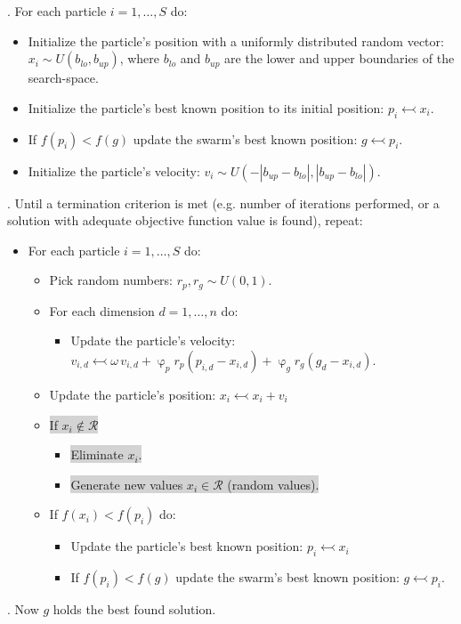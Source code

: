 \documentclass[10pt,letterpaper]{article}
\begin{document}
	. For each particle $i = 1,\ldots, S$ do:
	 \begin{itemize}
		\item Initialize the particle's position with a uniformly distributed random vector: $x_i \sim U(b_{lo}, b_{up})$, where $b_{lo}$ and $b_{up}$ are the lower and upper boundaries of the search-space.
		\item Initialize the particle's best known position to its initial position: $p_i \leftarrowtail x_i$.
		\item If $f(p_i)<f(g)$ update the swarm's best known position: $g \leftarrowtail p_i$.
		\item Initialize the particle's velocity: $v_i \sim U(-|b_{up}-b_{lo}|, |b_{up}-b_{lo}|)$.
	\end{itemize}
	. Until a termination criterion is met (e.g. number of iterations performed, or a solution with adequate objective function value is found), repeat:
	\begin{itemize}
		\item For each particle $i = 1,\ldots, S$ do:
		\begin{itemize}
			\item Pick random numbers: $r_p, r_g \sim U(0,1)$.
			\item For each dimension $d = 1,\ldots, n$ do:
			\begin{itemize}
				\item Update the particle's velocity: $v_{i,d} \leftarrowtail \omega \, v_{i,d} + \upvarphi_p r_p (p_{i,d}-x_{i,d}) + \upvarphi_g r_g (g_d-x_{i,d})$.
			\end{itemize}
			\item Update the particle's position: $x_i \leftarrowtail x_i + v_i$
			\item \colorbox{lightgray}{If $x_i \not\in \mathcal{R}$}
			\begin{itemize}
				\item \colorbox{lightgray}{Eliminate $x_i$.}
				\item \colorbox{lightgray}{Generate new values $x_i \in \mathcal{R}$ (random values).}
			\end{itemize}
			\item If $f(x_i) < f(p_i)$ do:
			\begin{itemize}
				\item Update the particle's best known position: $p_i \leftarrowtail x_i$
				\item If $f(p_i) < f(g)$ update the swarm's best known position: $g \leftarrowtail p_i$.
			\end{itemize}
		\end{itemize}
	\end{itemize}
	. Now $g$ holds the best found solution.
\end{document}
